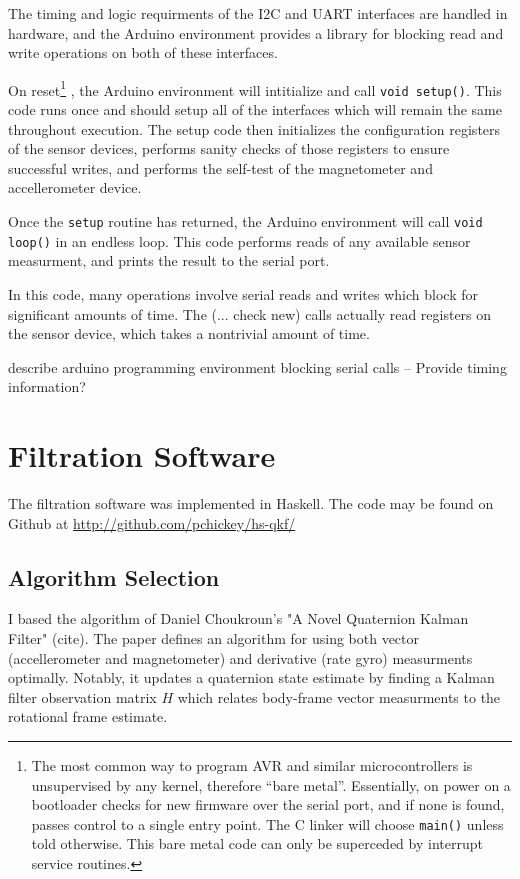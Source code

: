 \documentclass[12pt]{report}
\begin{document}
The timing and logic requirments of the I2C and UART interfaces are handled in hardware, and the Arduino environment provides a library for blocking read and write operations on both of these interfaces. 

On reset\footnote{The most common way to program AVR and similar microcontrollers is unsupervised by any kernel, therefore ``bare metal''. Essentially, on power on a bootloader checks for new firmware over the serial port, and if none is found, passes control to a single entry point. The C linker will choose \lstinline$main()$ unless told otherwise. This bare metal code can only be superceded by interrupt service routines.}
, the Arduino environment will intitialize and call \lstinline$void setup()$. This code runs once and should setup all of the interfaces which will remain the same throughout execution. The setup code then initializes the configuration registers of the sensor devices, performs sanity checks of those registers to ensure successful writes, and performs the self-test of the magnetometer and accellerometer device. 


Once the \lstinline$setup$ routine has returned, the Arduino environment will call \lstinline$void loop()$ in an endless loop. This code performs reads of any available sensor measurment, and prints the result to the serial port.


In this code, many operations involve serial reads and writes which block for significant amounts of time. The (... check new) calls actually read registers on the sensor device, which takes a nontrivial amount of time. 



describe arduino programming environment
blocking serial calls
-- Provide timing information?

\section{Filtration Software}
The filtration software was implemented in Haskell. The code may be found on Github at \url{http://github.com/pchickey/hs-qkf/}
\lstset{language=Haskell}
\subsection{Algorithm Selection}
I based the algorithm of Daniel Choukroun's "A Novel Quaternion Kalman Filter" (cite). The paper defines an algorithm for using both vector (accellerometer and magnetometer) and derivative (rate gyro) measurments optimally. Notably, it updates a quaternion state estimate by finding a Kalman filter observation matrix $H$ which relates body-frame vector measurments to the rotational frame estimate.
\end{document}
